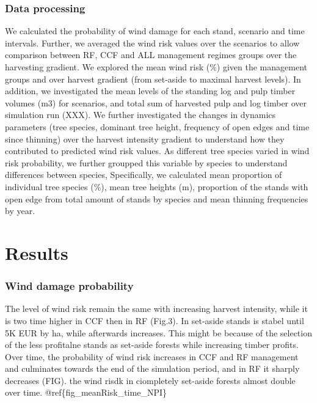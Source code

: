 \documentclass[]{elsarticle} %
\begin{document}
\hypertarget{data-processing}{%
\subsubsection{Data processing}\label{data-processing}}

We calculated the probability of wind damage for each stand, scenario and time intervals. Further, we averaged the wind risk values over the scenarios to allow comparison between RF, CCF and ALL management regimes groups over the harvesting gradient. We explored the mean wind risk (\%) given the management groups and over harvest gradient (from set-aside to maximal harvest levels). In addition, we investigated the mean levels of the standing log and pulp timber volumes (m3) for scenarios, and total sum of harvested pulp and log timber over simulation run (XXX). We further investigated the changes in dynamics parameters (tree species, dominant tree height, frequency of open edges and time since thinning) over the harvest intensity gradient to understand how they contributed to predicted wind risk values. As different tree species varied in wind risk probability, we further groupped this variable by species to understand differences between species, Specifically, we calculated mean proportion of individual tree species (\%), mean tree heights (m), proportion of the stands with open edge from total amount of stands by species and mean thinning frequencies by year.

\hypertarget{results}{%
\section{Results}\label{results}}

\hypertarget{wind-damage-probability}{%
\subsubsection{Wind damage probability}\label{wind-damage-probability}}

The level of wind risk remain the same with increasing harvest intensity, while it is two time higher in CCF then in RF (Fig.3). In set-aside stands is stabel until 5K EUR by ha, while afterwards increases. This might be because of the selection of the less profitalne stands as set-aside forests while increasing timber profits. Over time, the probability of wind risk increases in CCF and RF management and culminates towards the end of the simulation period, and in RF it sharply decreases (FIG). the wind risdk in ciompletely set-aside forests almost double over time. @ref\{fig\_meanRisk\_time\_NPI\}
\end{document}
